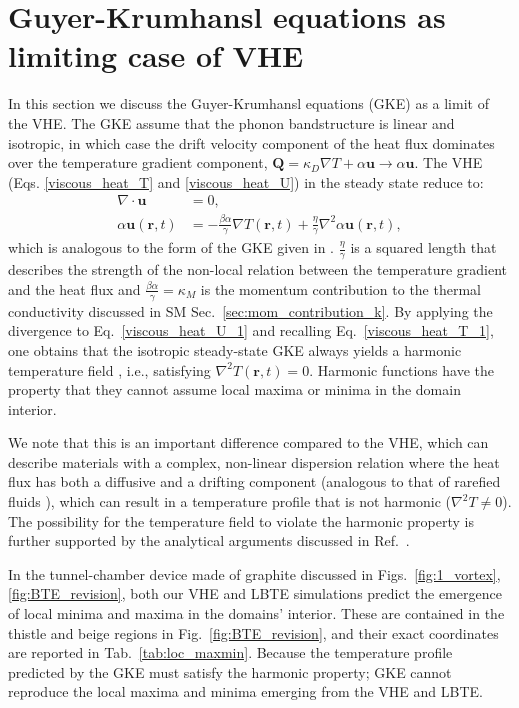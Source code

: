 \documentclass[
prb,
twocolumn,
superscriptaddress,
 amsmath,amssymb,
 aps,
longbibliography,
]{revtex4-2}
\begin{document}
\section{Guyer-Krumhansl equations as limiting case of VHE}
\label{sec:GKE_limit}
In this section we discuss the Guyer-Krumhansl equations (GKE) \cite{guyer_solution_1966,sendra_derivation_2021} as a limit of the VHE. The GKE assume that the phonon bandstructure is linear and isotropic, in which case the drift velocity component of the heat flux dominates over the temperature gradient component, $\bm{Q}=\kappa_D\nabla T +\alpha \bm{u}\to \alpha \bm{u}$.
The VHE (Eqs. \ref{viscous_heat_T} and \ref{viscous_heat_U}) in the steady state reduce to:
\begin{align}
\nabla\cdot \bm{u}&=0,
 \label{viscous_heat_T_1}\\
 \alpha\bm{u}({\bm r}, t)&=-\frac{\beta\alpha}{\gamma} \nabla  T({\bm r}, t) {+} \frac{\eta}{\gamma} \nabla^2 \alpha \bm{u}({\bm r}, t),\label{viscous_heat_U_1}
\end{align}
which is analogous to the form of the GKE given in \cite{sendra_derivation_2021}. $\frac{\eta}{\gamma}$ is a squared length that describes the strength of the non-local relation between the temperature gradient and the heat flux and $\frac{\beta\alpha}{\gamma}=\kappa_M$ is the momentum contribution to the thermal conductivity discussed in SM Sec.~\ref{sec:mom_contribution_k}.
By applying the divergence to Eq.~\ref{viscous_heat_U_1} and recalling Eq.~\ref{viscous_heat_T_1}, one obtains that the isotropic steady-state GKE always yields a harmonic temperature field \cite{tzou_unified_1995,kovacs_two-temperature_2022}, i.e., satisfying  $\nabla^2 T({\bm r}, t)=0$.
Harmonic functions have the property that they cannot assume local maxima or minima in the domain interior.

We note that this is an important difference compared to the VHE, which can describe materials with a complex, non-linear dispersion relation where the heat flux has both a diffusive and a drifting component (analogous to that of rarefied fluids \cite{sambasivam_numerical_2014}), which can result in a temperature profile that is not harmonic ($\nabla^2 T\neq 0$). The possibility for the temperature field to violate the harmonic property is further supported by the analytical arguments discussed in Ref.~\cite{coulterCoupledElectronphononHydrodynamics2025a}.

In the tunnel-chamber device made of graphite discussed in Figs.~\ref{fig:1_vortex},\ref{fig:BTE_revision}, both our VHE and LBTE simulations predict the emergence of local minima and maxima in the domains' interior. These are contained in the thistle and beige regions in Fig.~\ref{fig:BTE_revision}, and their exact coordinates are reported in Tab.~\ref{tab:loc_maxmin}. Because the temperature profile predicted by the GKE must satisfy the harmonic property; GKE cannot reproduce the local maxima and minima emerging from the VHE and LBTE.
\end{document}
